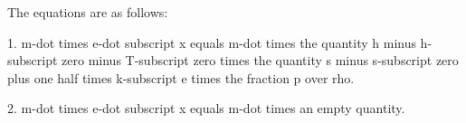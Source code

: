 The equations are as follows:

1. m-dot times e-dot subscript x equals m-dot times the quantity h minus h-subscript zero minus T-subscript zero times the quantity s minus s-subscript zero plus one half times k-subscript e times the fraction p over rho.

2. m-dot times e-dot subscript x equals m-dot times an empty quantity.